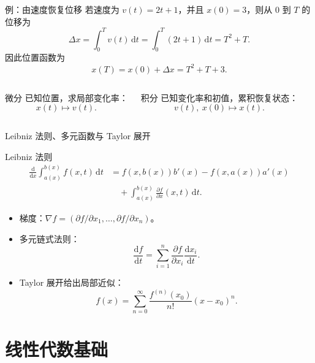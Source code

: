 \begin{frame}{例：由速度恢复位移}
  若速度为 $v(t)=2t+1$，并且 $x(0)=3$，则从 $0$ 到 $T$ 的位移为
  \[
    \Delta x=\int_0^T v(t)\,\mathrm{d}t
    =\int_0^T(2t+1)\,\mathrm{d}t
    =T^2+T.
  \]
  因此位置函数为
  \[
    x(T)=x(0)+\Delta x=T^2+T+3.
  \]
  \begin{columns}[T]
    \begin{block}{微分}
      已知位置，求局部变化率：
      \[
        x(t)\longmapsto v(t).
      \]
    \end{block}
    \begin{block}{积分}
      已知变化率和初值，累积恢复状态：
      \[
        v(t),\ x(0)\longmapsto x(t).
      \]
    \end{block}
  \end{columns}
\end{frame}

\begin{frame}{Leibniz 法则、多元函数与 Taylor 展开}
  \begin{block}{Leibniz 法则}
    \begin{align*}
      \frac{\mathrm{d}}{\mathrm{d}x}\int_{a(x)}^{b(x)}f(x,t)\,\mathrm{d}t
      &=f(x,b(x))b'(x)-f(x,a(x))a'(x)\\
      &\quad+\int_{a(x)}^{b(x)}\frac{\partial f}{\partial x}(x,t)\,\mathrm{d}t.
    \end{align*}
  \end{block}
  \begin{itemize}
    \item 梯度：$\nabla f=(\partial f/\partial x_1,\ldots,\partial f/\partial x_n)$。
    \item 多元链式法则：
    \[
      \frac{\mathrm{d}f}{\mathrm{d}t}=
      \sum_{i=1}^n\frac{\partial f}{\partial x_i}\frac{\mathrm{d}x_i}{\mathrm{d}t}.
    \]
    \item Taylor 展开给出局部近似：
    \[
      f(x)=\sum_{n=0}^{\infty}\frac{f^{(n)}(x_0)}{n!}(x-x_0)^n.
    \]
  \end{itemize}
\end{frame}

\section{线性代数基础}

